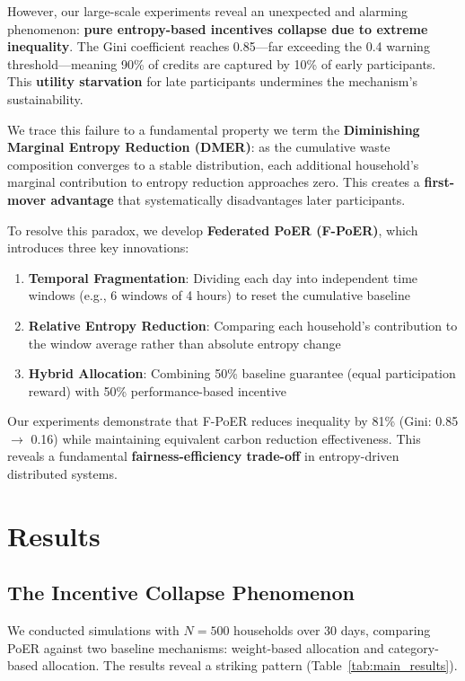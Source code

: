 \documentclass[12pt,a4paper]{article}
\begin{document}
However, our large-scale experiments reveal an unexpected and alarming phenomenon: \textbf{pure entropy-based incentives collapse due to extreme inequality}. The Gini coefficient reaches 0.85—far exceeding the 0.4 warning threshold—meaning 90\% of credits are captured by 10\% of early participants. This \textbf{utility starvation} for late participants undermines the mechanism's sustainability.

We trace this failure to a fundamental property we term the \textbf{Diminishing Marginal Entropy Reduction (DMER)}: as the cumulative waste composition converges to a stable distribution, each additional household's marginal contribution to entropy reduction approaches zero. This creates a \textbf{first-mover advantage} that systematically disadvantages later participants.

To resolve this paradox, we develop \textbf{Federated PoER (F-PoER)}, which introduces three key innovations:
\begin{enumerate}
    \item \textbf{Temporal Fragmentation}: Dividing each day into independent time windows (e.g., 6 windows of 4 hours) to reset the cumulative baseline
    \item \textbf{Relative Entropy Reduction}: Comparing each household's contribution to the window average rather than absolute entropy change
    \item \textbf{Hybrid Allocation}: Combining 50\% baseline guarantee (equal participation reward) with 50\% performance-based incentive
\end{enumerate}

Our experiments demonstrate that F-PoER reduces inequality by 81\% (Gini: 0.85 $\rightarrow$ 0.16) while maintaining equivalent carbon reduction effectiveness. This reveals a fundamental \textbf{fairness-efficiency trade-off} in entropy-driven distributed systems.

\section{Results}

\subsection{The Incentive Collapse Phenomenon}

We conducted simulations with $N=500$ households over 30 days, comparing PoER against two baseline mechanisms: weight-based allocation and category-based allocation. The results reveal a striking pattern (Table~\ref{tab:main_results}).
\end{document}
